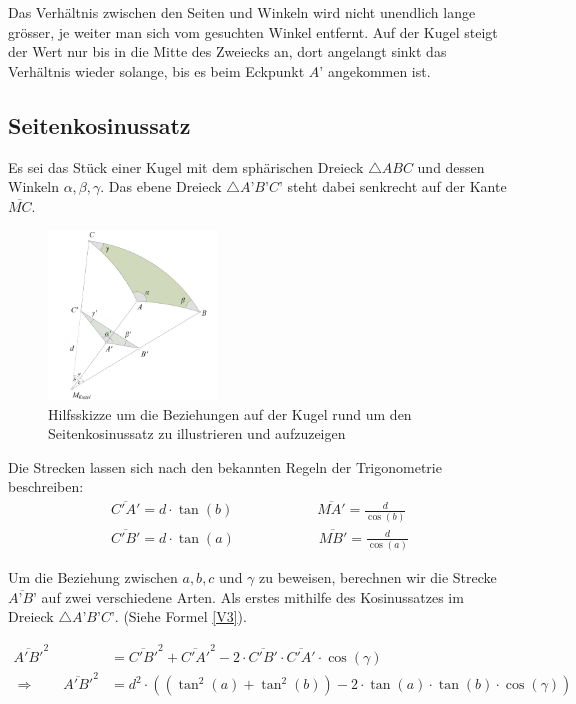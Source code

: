 \begin{refsection}
Das Verhältnis zwischen den Seiten und Winkeln wird nicht unendlich lange grösser, je weiter man sich vom gesuchten Winkel entfernt. Auf der Kugel steigt der Wert nur bis in die Mitte des Zweiecks an, dort angelangt sinkt das Verhältnis wieder solange, bis es beim Eckpunkt $A’$ angekommen ist.


\subsection{Seitenkosinussatz}
Es sei das Stück einer Kugel mit dem sphärischen Dreieck $\triangle{ABC}$ und dessen Winkeln $\alpha, \beta, \gamma$. Das ebene Dreieck $\triangle{A’B’C’}$ steht dabei senkrecht auf der Kante $\overline{MC}$.

\begin{figure}[htbp]
\centering
\includegraphics[width=0.4\textwidth]{kugel/Seitenkosinus.jpg}
\caption{Hilfsskizze um die Beziehungen auf der Kugel rund um den Seitenkosinussatz zu illustrieren und aufzuzeigen}
\end{figure}

Die Strecken lassen sich nach den bekannten Regeln der Trigonometrie beschreiben:
\begin{align*}
\overline{C'A'} = d\cdot {\tan(b)} \quad \quad \quad \quad \quad \quad 
\overline{MA'} = \frac{ d }{\cos(b)} \\
\overline{C'B'} = d\cdot {\tan(a)} \quad \quad \quad \quad \quad \quad 
\overline{MB'} = \frac{ d }{\cos(a)}
\end{align*} 

Um die Beziehung zwischen $a,b,c$ und $\gamma$ zu beweisen, berechnen wir die Strecke $\overline{A’B’}$ auf zwei verschiedene Arten.
Als erstes mithilfe des Kosinussatzes im Dreieck $\triangle{A’B’C’}$. (Siehe Formel \eqref{V3}).

\begin{align}
\overline{A'B'}^{ 2 } &= \overline{ C'B' }^{ 2 } + \overline{ C'A' }^{ 2 } - 2 \cdot \overline{C'B'} \cdot \overline{ C'A' } \cdot \cos(\gamma) \nonumber \\ 
\Rightarrow \quad \quad
\overline{A'B'}^{ 2 } &= d^{ 2 } \cdot \left(\left(\tan^{ 2 }(a) + \tan^{ 2 }(b)\right) - 2\cdot \tan(a) \cdot \tan(b) \cdot \cos(\gamma)\right) 
\label {V3} 
\end{align}


\end{refsection}
